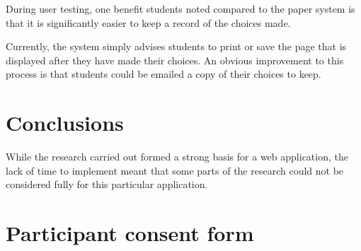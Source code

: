 \documentclass[draft]{scrartcl}
\begin{document}
During user testing, one benefit students noted compared to the paper system
is that it is significantly easier to keep a record of the choices made.

Currently, the system simply advises students to print or save the page that
is displayed after they have made their choices. An obvious improvement to
this process is that students could be emailed a copy of their choices to
keep.

\section{Conclusions}
\label{sec:conclusions}



While the research carried out formed a strong basis for a web application,
the lack of time to implement meant that some parts of the research could not
be considered fully for this particular application.

\appendix


% 
% 
% 
% 

\clearpage
\section{Participant consent form}
\label{sec:consent}
\end{document}
